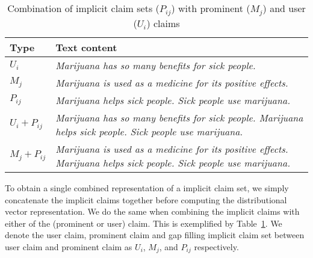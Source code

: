 \begin{table}
\begin{center}
{\small
{\def\arraystretch{1.2}\tabcolsep=2pt
\begin{tabular}{@{}lp{13cm}@{}}
\toprule
Type & Text content  \\
\midrule
$U_i$      & \emph{Marijuana has so many benefits for sick people.} \\
$M_j$    & \emph{Marijuana is used as a medicine for its positive effects.}   \\
$P_{ij}$     & \emph{Marijuana helps sick people. Sick people use marijuana.} \\
\midrule
$U_i + P_{ij}$   & \emph{Marijuana has so many benefits for sick people.
Marijuana helps sick people. Sick people use marijuana.} \\ 
$M_j + P_{ij}$   & \emph{Marijuana is used as a medicine for its positive
effects. Marijuana helps sick people. Sick people use marijuana.}\\
\bottomrule
\end{tabular}}}
	\caption{Combination of implicit claim sets ($P_{ij}$) with  prominent
	($M_j$) and user ($U_i$) claims}
\label{tab:argpremise_concatenation}
\end{center}
\end{table}

To obtain a single combined representation of a implicit claim set, we simply
concatenate the implicit claims together before computing the distributional vector
representation. 
We do the same when combining the implicit claims with either of the (prominent or user) claim.
This is exemplified by Table~\ref{tab:argpremise_concatenation}. 
We denote the user claim, prominent claim and gap filling implicit claim set between 
user claim and prominent claim as
$U_i$, $M_j$, and $P_{ij}$ respectively. 


